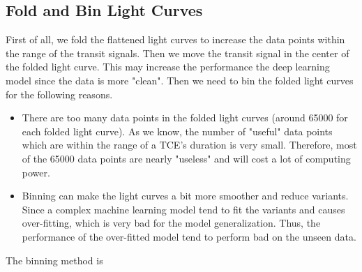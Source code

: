     \subsection{Fold and Bin Light Curves}
      First of all, we fold the flattened light curves to increase the data points within 
      the range of the transit signals. Then we move the transit signal in the center 
      of the folded light curve. This may increase the performance the deep learning model 
      since the data is more "clean". Then we need to bin the folded light curves for the 
      following reasons. 
      \begin{itemize}
        \item There are too many data points in the folded light curves 
          (around 65000 for each folded light curve). 
          As we know, the number of "useful" data points which are within the range of a 
          TCE's duration is very small. Therefore, most of the 65000 data points are 
          nearly "useless" and will cost a lot of computing power. 
        \item Binning can make the light curves a bit more smoother and reduce variants.
          Since a complex machine learning model tend to fit the variants and causes
          over-fitting, which is very bad for the model generalization. Thus, the performance
          of the over-fitted model tend to perform bad on the unseen data.
      \end{itemize}

      The binning method is 
      

      

     